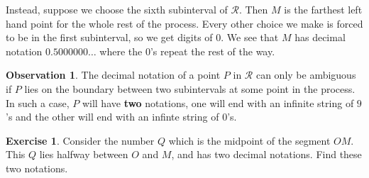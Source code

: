 \documentclass[12pt,letterpaper]{article}
\theoremstyle{definition}
\newtheorem{exercise}[question]{Exercise}
\newtheorem*{observation}{Observation}
\begin{document}
Instead, suppose we choose the sixth subinterval of $\mathcal{R}$.
Then $M$ is the farthest left hand point for the whole rest of the process.
Every other choice we make is forced to be in the first subinterval, so we get digits of $0$.
We see that $M$ has decimal notation $0.5000000\ldots$ where the $0$'s repeat the rest of the way.


\begin{observation}
The decimal notation of a point $P$ in $\mathcal{R}$ can only be ambiguous if $P$ lies on the boundary between two subintervals at some point in the process.
In such a case, $P$ will have \textbf{two} notations, one will end with an infinite string of $9$'s and the other will end with an infinte string of $0$'s.
\end{observation}


\begin{exercise}
Consider the number $Q$ which is the midpoint of the segment $OM$.
This $Q$ lies halfway between $O$ and $M$, and has two decimal notations.
Find these two notations.
\end{exercise}



\end{document}
